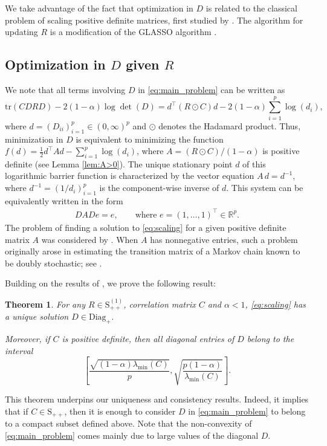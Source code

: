 \documentclass[12pt]{amsart}
\numberwithin{equation}{section}
\numberwithin{equation}{section}
\theoremstyle{plain}
\newtheorem{thm}{Theorem}
\theoremstyle{definition}
\newcommand{\tr}{\mathrm{tr}}
\newcommand{\Spp}{\mathrm{S}_{++}}
\newcommand{\Sppone}{\mathrm{S}_{++}^{(1)}}
\newcommand{\R}{\mathbb{R}}
\newcommand{\Diagp}{\mathrm{Diag}_+}
\begin{document}
We take advantage of the fact that optimization in $D$ is related to the classical problem of scaling positive definite matrices, first studied by \cite{MO68}. The algorithm for updating $R$ is a modification of the GLASSO algorithm \cite{friedman2008sparse}.

\subsection{Optimization in \texorpdfstring{$D$ given $R$}{D given R}}\label{sec:algD}

We note that all terms involving $D$ in \eqref{eq:main_problem} can be written as
\[
\tr(CDRD) -2(1-\alpha)\log\det(D)= d^\top (R\odot C) d - 2(1-\alpha)\sum_{i=1}^p \log(d_i),
\]
where $d=(D_{ii})_{i=1}^p\in(0,\infty)^p$ and $\odot$ denotes the Hadamard product. Thus, minimization in $D$ is equivalent to minimizing the function $f(d)= \tfrac12 d^\top A d -\sum_{i=1}^p\log(d_i)$, where $A = (R\odot C)/(1-\alpha)$ is positive definite (see Lemma \ref{lem:A>0}). The unique stationary point $d$ of this logarithmic barrier function is characterized by the vector equation $A\, d = d^{-1}$,
where $d^{-1} = (1/d_{i})_{i=1}^p$ is the component-wise inverse of $d$. 
This system can be equivalently written in the form
\begin{align}\label{eq:scaling}
D A D e = e,\qquad \mbox{where } e=(1,\ldots,1)^\top\in\R^p.
\end{align}
The problem of finding a solution to \eqref{eq:scaling} for a given positive definite matrix $A$ was considered by \cite{MO68}. When $A$ has nonnegative entries, such a problem originally arose in estimating the transition matrix of a Markov chain known to be doubly stochastic; see  \cite{Sin64}.



Building on the results of \cite{Kal92}, we prove the following result:
\begin{thm}\label{thm:Dregion}
For any $R\in\Sppone$, correlation matrix $C$ and $\alpha<1$, \eqref{eq:scaling} has a unique solution $D\in\Diagp$. 

Moreover, if $C$ is positive definite, then all diagonal entries of $D$ belong to the interval
\[
\left[ \frac{\sqrt{(1-\alpha)\lambda_{\min}(C)}}{p} ,\sqrt{\frac{p (1-\alpha)}{\lambda_{\min}(C)}}\right].
\]
\end{thm}
This theorem underpins our uniqueness and consistency results. Indeed, it implies that if $C\in\Spp$, then it is enough to consider $D$ in \eqref{eq:main_problem} to belong to a compact subset defined above. Note that the non-convexity of \eqref{eq:main_problem} comes mainly due to large values of the diagonal $D$. 
\end{document}
